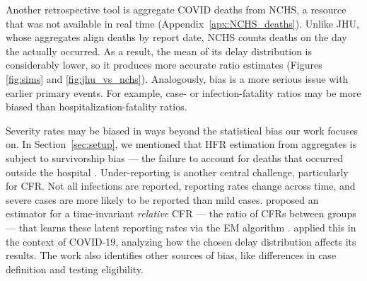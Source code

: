 \documentclass{article}
\begin{document}
Another retrospective tool is aggregate COVID deaths from NCHS, a resource that
was not available in real time (Appendix~\ref{apx:NCHS_deaths}). Unlike JHU,
whose aggregates align deaths by report date, NCHS counts deaths on the day the
actually occurred. As a result, the mean of its delay distribution is
considerably lower, so it produces more accurate ratio estimates (Figures
\ref{fig:sims} and \ref{fig:jhu_vs_nchs}). Analogously, bias is a more serious
issue with earlier primary events. For example, case- or infection-fatality
ratios may be more biased than hospitalization-fatality ratios. 

Severity rates may be biased in ways beyond the statistical bias our work
focuses on. 
In Section~\ref{sec:setup}, we mentioned that 
HFR estimation from aggregates is subject to survivorship bias --- 
the failure to account for deaths that occurred outside the hospital \citep{lipsitch2015potential}.
Under-reporting is another central challenge, particularly for CFR.
Not all infections are reported, reporting rates change across time, and severe
cases are more likely to be reported than mild cases.
\citet{reich2012estimating} proposed an estimator for a time-invariant
\emph{relative} CFR --- the ratio of CFRs between groups --- that learns these
latent reporting rates via the EM algorithm \citep{EM}. \citet{anastasios}
applied this in the context of COVID-19, analyzing how the chosen delay
distribution affects its results. The work also identifies other sources of bias, like
differences in case definition and testing eligibility.
\end{document}
